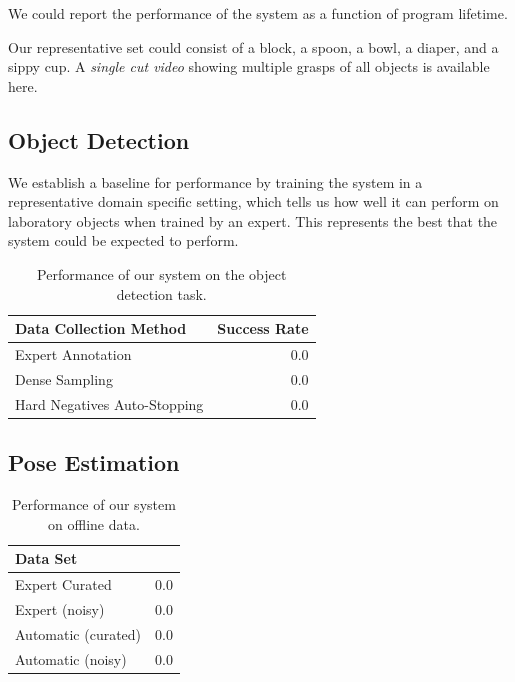 \documentclass[conference]{IEEEtran}
\begin{document}
We could report the performance of the system as a function of program lifetime.

Our representative set could consist of a block, a spoon,
a bowl, a diaper, and a sippy cup. A \emph{single cut video} showing multiple grasps
of all objects is available here.

\subsection{Object Detection}
We establish a baseline for performance by training the system in a representative domain
specific setting, which tells us how well it can perform on laboratory objects when trained by an 
expert. This represents the best that the system could be expected to perform.

\begin{table}
  \begin{center}
  \caption{Performance of our system on the object detection task.}
  \begin{tabular}{lr}
    \toprule
  Data Collection Method & Success Rate \\ 
  \midrule
  Expert Annotation & 0.0 \\ 
  Dense Sampling & 0.0 \\ 
  Hard Negatives Auto-Stopping & 0.0 \\ 
  \bottomrule
  \end{tabular}
  \end{center}
\end{table}

\subsection{Pose Estimation}

\begin{table}
  \caption{Performance of our system on offline data.}
  \begin{center}
  \begin{tabular}{lr}
\toprule
  Data Set            &  \\ 
\midrule
  Expert Curated      & 0.0 \\ 
  Expert (noisy)      & 0.0 \\ 
  Automatic (curated) & 0.0 \\ 
  Automatic (noisy)   & 0.0\\
\bottomrule
  \end{tabular}

  \end{center}
\end{table}
\end{document}
